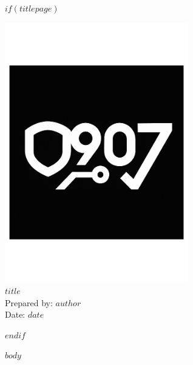 \documentclass[a4paper,12pt]{report} %
\begin{document}
$if(titlepage)$
\begin{titlepage}
  \pagecolor{black}   %
  \color{white}       %

  \vspace*{3cm}
  \includegraphics[width=0.6\textwidth]{cover.pdf} \\[2cm] %
  {\Huge\bfseries $title$ \\[1cm]}
  {\Large Prepared by: $author$ \\[0.5cm]}
  {\Large Date: $date$}
  \vfill
\end{titlepage}
$endif$

\pagecolor{white}
\color{black}

\tableofcontents
\newpage

$body$
\end{document}
